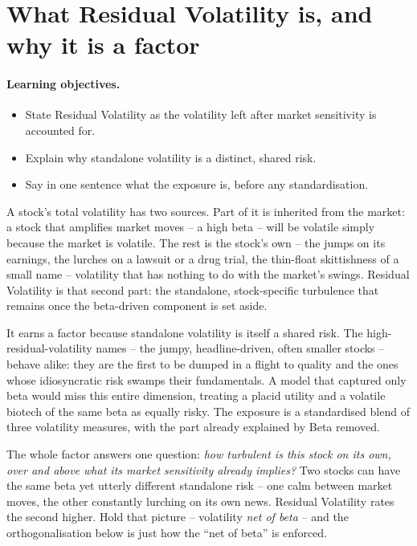 \documentclass[11pt]{article}
\theoremstyle{definition}
\theoremstyle{plain}
\theoremstyle{remark}
\begin{document}
\tableofcontents
\bigskip

\section{What Residual Volatility is, and why it is a factor}\label{sec:what}

\paragraph{Learning objectives.}
\begin{itemize}[leftmargin=1.4em,topsep=2pt]
  \item State Residual Volatility as the volatility left after market sensitivity is accounted for.
  \item Explain why standalone volatility is a distinct, shared risk.
  \item Say in one sentence what the exposure is, before any standardisation.
\end{itemize}

A stock's total volatility has two sources. Part of it is inherited from the market: a stock that amplifies market moves -- a high beta -- will be volatile simply because the market is volatile. The rest is the stock's own -- the jumps on its earnings, the lurches on a lawsuit or a drug trial, the thin-float skittishness of a small name -- volatility that has nothing to do with the market's swings. Residual Volatility is that second part: the standalone, stock-specific turbulence that remains once the beta-driven component is set aside.

It earns a factor because standalone volatility is itself a shared risk. The high-residual-volatility names -- the jumpy, headline-driven, often smaller stocks -- behave alike: they are the first to be dumped in a flight to quality and the ones whose idiosyncratic risk swamps their fundamentals. A model that captured only beta would miss this entire dimension, treating a placid utility and a volatile biotech of the same beta as equally risky. The exposure is a standardised blend of three volatility measures, with the part already explained by Beta removed.

\begin{intuition}
The whole factor answers one question: \emph{how turbulent is this stock on its own, over and above what its market sensitivity already implies?} Two stocks can have the same beta yet utterly different standalone risk -- one calm between market moves, the other constantly lurching on its own news. Residual Volatility rates the second higher. Hold that picture -- volatility \emph{net of beta} -- and the orthogonalisation below is just how the ``net of beta'' is enforced.
\end{intuition}
\end{document}
